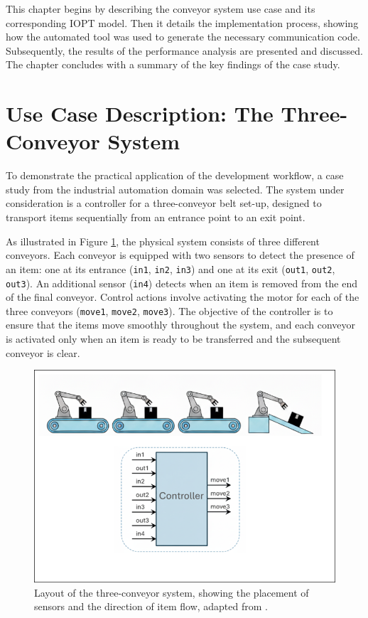 This chapter begins by describing the conveyor system use case and its corresponding IOPT model. Then it details the implementation process, showing how the automated tool was used to generate the necessary communication code. Subsequently, the results of the performance analysis are presented and discussed. The chapter concludes with a summary of the key findings of the case study.


\section{Use Case Description: The Three-Conveyor System}
\label{sec:use_case_description}

To demonstrate the practical application of the development workflow, a case study from the industrial automation domain was selected. The system under consideration is a controller for a three-conveyor belt set-up, designed to transport items sequentially from an entrance point to an exit point.

As illustrated in Figure \ref{fig:conveyor_layout}, the physical system consists of three different conveyors. Each conveyor is equipped with two sensors to detect the presence of an item: one at its entrance (\texttt{in1}, \texttt{in2}, \texttt{in3}) and one at its exit (\texttt{out1}, \texttt{out2}, \texttt{out3}). An additional sensor (\texttt{in4}) detects when an item is removed from the end of the final conveyor. Control actions involve activating the motor for each of the three conveyors (\texttt{move1}, \texttt{move2}, \texttt{move3}). The objective of the controller is to ensure that the items move smoothly throughout the system, and each conveyor is activated only when an item is ready to be transferred and the subsequent conveyor is clear.

\begin{figure}[htb]
    \centering
    \includegraphics[width=0.6\columnwidth]{Chapters/Figures/layout.png}
    \caption{Layout of the three-conveyor system, showing the placement of sensors and the direction of item flow, adapted from \cite{tavaresgomes2026}.}
    \label{fig:conveyor_layout}
\end{figure}

